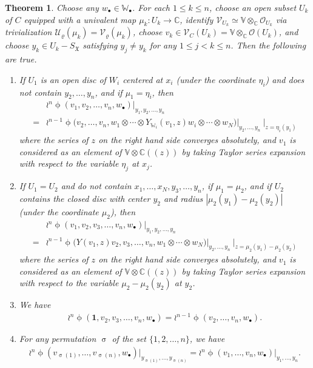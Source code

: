 \documentclass[12pt,a4paper,notitlepage]{report}
\theoremstyle{definition}
\theoremstyle{plain}
\newtheorem{thm}[df]{Theorem}
\newcommand{\fk}{\mathfrak}
\newcommand{\mc}{\mathcal}
\newcommand{\id}{\mathbf{1}}
\newcommand{\scr}{\mathscr}
\newcommand{\blt}{\bullet}
\newcommand{\Vbb}{\mathbb V}
\newcommand{\Wbb}{\mathbb W}
\newcommand{\Cbb}{\mathbb C}
\numberwithin{equation}{section}
\begin{document}
\begin{thm}\label{lb92}
Choose any $w_\blt\in\Wbb_\blt$. For each $1\leq k\leq n$, choose an open subset  $U_k$  of $C$ equipped with a univalent map $\mu_k:U_k\rightarrow\Cbb$, identify $\scr V_{U_k}\simeq \Vbb\otimes_\Cbb\scr O_{U_k}$ via trivialization $\mc U_\varrho(\mu_k)=\mc V_\varrho(\mu_k)$,  choose $v_k\in\scr V_C(U_k)=\Vbb\otimes_\Cbb\scr O(U_k)$, and choose $y_k\in U_k-S_{\fk X}$ satisfying $y_j\neq y_k$ for any $1\leq j<k\leq n$. Then the following are true.
\begin{enumerate}[label=(\arabic*)]
\item If $U_1$ is an open disc of $W_i$ centered at $x_i$ (under the coordinate $\eta_i$) and does not contain $y_2,\dots,y_n$, and if $\mu_1=\eta_i$, then
	\begin{align}
	&\wr^n\upphi(v_1,v_2,\dots,v_n,w_\blt)\big|_{y_1,y_2,\dots,y_n}\nonumber\\
	=&\wr^{n-1}\upphi\big(v_2,\dots,v_n,w_1\otimes\cdots\otimes Y_{\Wbb_i}(v_1,z)w_i\otimes\cdots\otimes w_N\big)\big|_{y_2,\dots,y_n}~\big|_{z=\eta_i(y_1)}
	\end{align}
where the series of $z$ on the right hand side converges absolutely, and $v_1$ is considered as an element of $\Vbb\otimes\Cbb((z))$ by taking Taylor series expansion with respect to the variable $\eta_j$ at $x_j$.
\item If $U_1=U_2$ and do not contain $x_1,\dots,x_N,y_3,\dots,y_n$, if $\mu_1=\mu_2$, and if $U_2$ contains the closed disc with center $y_2$ and radius $|\mu_2(y_1)-\mu_2(y_2)|$ (under the coordinate $\mu_2$), then
	\begin{align}
	&\wr^n\upphi(v_1,v_2,v_3,\dots,v_n,w_\blt)\big|_{y_1,y_2,\dots,y_n}\nonumber\\
	=&\wr^{n-1}\upphi\big(Y(v_1,z)v_2,v_3,\dots,v_n,w_1\otimes\cdots\otimes w_N\big)\big |_{y_2,\dots,y_n}~\big |_{z=\mu_2(y_1)-\mu_2(y_2)}
	\end{align}
where the series of $z$ on the right hand side converges absolutely, and $v_1$ is considered as an element of $\Vbb\otimes\Cbb((z))$ by taking Taylor series expansion with respect to the variable $\mu_2-\mu_2(y_2)$ at $y_2$.
	\item  We have
	\begin{align}
\wr^n\upphi(\id,v_2,v_3,\dots,v_n,w_\blt)=\wr^{n-1}\upphi(v_2,\dots,v_n,w_\blt).
	\end{align}
	\item For any permutation $\upsigma$ of the set $\{1,2,\dots,n\}$, we have
	\begin{align}
	\wr^n\upphi(v_{\upsigma(1)},\dots,v_{\upsigma(n)},w_\blt)\big|_{y_{\upsigma(1)},\dots,y_{\upsigma(n)}}=\wr^n\upphi(v_1,\dots,v_n,w_\blt)\big|_{y_1,\dots,y_n}.
	\end{align}
\end{enumerate}
\end{thm}
\end{document}
